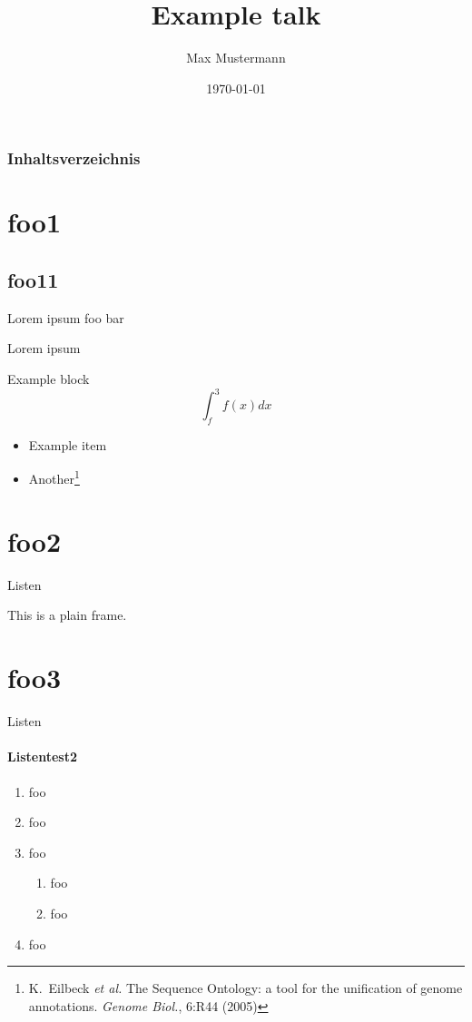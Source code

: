 \documentclass{beamer}
\author{Max Mustermann}
\title{Example talk}
\date{\today}
\begin{document}
\begin{frame}

\titlepage
\end{frame}

\begin{frame}
	\frametitle{Inhaltsverzeichnis}
	\tableofcontents
\end{frame}

\section{foo1}
\subsection{foo11}

\begin{frame}{Lorem ipsum}
foo bar
\end{frame}

\begin{frame}{Lorem ipsum}
\begin{block}{Example block}
$$\int_{f}^3 f(x) dx$$
\begin{itemize}
  \item Example item
  \pause
  \item Another\footnote{\tiny K.~Eilbeck \emph{et al.} The Sequence Ontology: a tool for the unification of genome annotations. \emph{Genome Biol.}, 6:R44 (2005)}
\end{itemize}
\end{block}
\end{frame}

\section{foo2}
\begin{frame}[plain]{Listen}
\vfill
\begin{center}\begin{Large}This is a plain frame.\end{Large}\vfill
\end{center}
\vfill
\end{frame}

\section{foo3}
\begin{frame}[<+->]{Listen}
\framesubtitle{Listentest2}
\begin{enumerate}
\item foo
\item foo
\item foo
\begin{enumerate}
\item foo
\item foo
\end{enumerate}
\item foo
\end{enumerate}
\end{frame}
\end{document}
